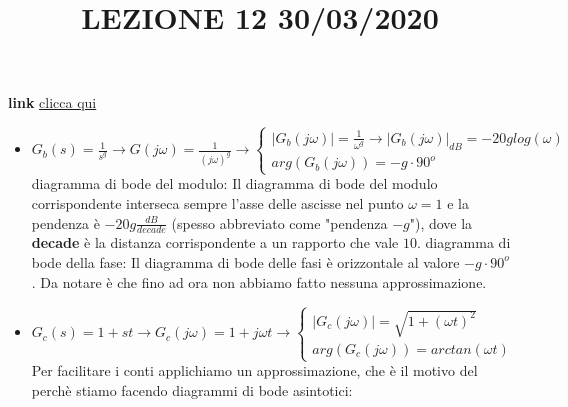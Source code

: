 \title{LEZIONE 12 30/03/2020}\newline
\textbf{link} \href{https://web.microsoftstream.com/video/22a546ac-3e6b-43e0-b0f9-45a630661700?list=user&userId=faa91214-a6f5-40d7-8875-253fd49b8ce1}{clicca qui}
\begin{itemize}
    \item $G_b(s)= \frac{1}{s^g} \rightarrow G(j \omega) = \frac{1}{(j \omega)^g} \rightarrow \begin{cases}
        |G_b(j \omega)| = \frac{1}{\omega^g} \rightarrow |G_b(j \omega)|_{dB}= - 20 g log(\omega)\\
        arg(G_b(j \omega)) = - g \cdot 90^o
    \end{cases} $\newline \newline
    diagramma di bode del modulo: Il diagramma di bode del modulo corrispondente interseca sempre l'asse delle ascisse nel punto $\omega = 1$ e la pendenza è $-20g \frac{dB}{decade}$ (spesso abbreviato come "pendenza $-g$"), dove la \textbf{decade} è la distanza corrispondente a un rapporto che vale $10$.\newline \newline
    diagramma di bode della fase: Il diagramma di bode delle fasi è orizzontale al valore $-g \cdot 90^o$.\newline \newline
    Da notare è che fino ad ora non abbiamo fatto nessuna approssimazione.
    \item $G_c(s)= 1 + st \rightarrow  G_c(j \omega) = 1 + j \omega t \rightarrow \begin{cases}
        |G_c(j \omega)| = \sqrt{1 + (\omega t)^2}\\
        arg(G_c(j \omega))= arctan(\omega t)
    \end{cases}$\newline
    Per facilitare i conti applichiamo un approssimazione, che è il motivo del perchè stiamo facendo diagrammi di bode asintotici:
\end{itemize}
